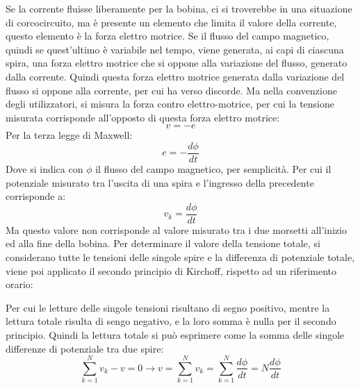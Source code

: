 \documentclass{article}
\numberwithin{equation}{subsection}
\begin{document}
Se la corrente fluisse liberamente per la bobina, ci si troverebbe in una situazione di corcocircuito, ma è presente un elemento che limita il valore della corrente, questo 
elemento è la forza elettro motrice. 
Se il flusso del campo magnetico, quindi se quest'ultimo è variabile nel tempo, viene generata, ai capi di ciascuna spira, una forza elettro motrice che si oppone alla variazione 
del flusso, generato dalla corrente. Quindi questa forza elettro motrice generata dalla variazione del flusso si oppone alla corrente, per cui ha verso discorde. Ma nella 
convenzione degli utilizzatori, si misura la forza contro elettro-motrice, per cui la tensione misurata corrisponde all'opposto di questa forza elettro motrice: 
\begin{equation*}
    v=-e
\end{equation*}
Per la terza legge di Maxwell:
\begin{equation*}
    e=-\displaystyle\frac{d\phi}{dt}
\end{equation*}
Dove si indica con $\phi$ il flusso del campo magnetico, per semplicità. Per cui il potenziale misurato tra l'uscita di una spira e l'ingresso della precedente corrisponde a:
\begin{equation*}
    v_k=\displaystyle\frac{d\phi}{dt}
\end{equation*}
Ma questo valore non corrisponde al valore misurato tra i due morsetti all'inizio ed alla fine della bobina. Per determinare il valore della tensione totale, si considerano 
tutte le tensioni delle singole spire e la differenza di potenziale totale, viene poi applicato il secondo principio di Kirchoff, rispetto ad un riferimento orario:
\begin{center}
\end{center}
Per cui le letture delle singole tensioni risultano di segno positivo, mentre la lettura totale risulta di sengo negativo, e la loro somma è nulla per il secondo principio. 
Quindi la lettura totale si può esprimere come la somma delle singole differenze di potenziale tra due spire:
\begin{equation*}
    \displaystyle\sum_{k=1}^Nv_k-v=0\to v=\sum_{k=1}^Nv_k=\sum_{k=1}^N\frac{d\phi}{dt}=N\frac{d\phi}{dt}
\end{equation*}
\end{document}
